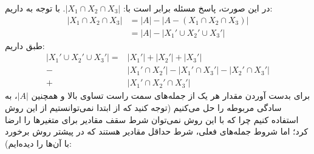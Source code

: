 \begin{PROBLEM}
{        در این صورت، پاسخ مسئله برابر است با:
        $|X_1 \cap X_2 \cap X_3| $.
        با توجه به 
         داریم:
        \begin{align*}
         |X_1 \cap X_2 \cap X_3| &= |A| - |A - (X_1 \cap X_2 \cap X_3)|\\
        &= |A| - |X_1' \cup X_2' \cup X_3'| 
        \end{align*}
        \p
        طبق 
         داریم:
        \begin{align*}
          |X_1' \cup X_2' \cup X_3'| = &|X_1'| + |X_2'| + |X_3'|\\
          - &|X_1' \cap X_2'| - |X_1' \cap X_3'| - |X_2' \cap X_3'|\\
          + &|X_1' \cap X_2' \cap X_3'| 
        \end{align*}
        \p
        برای بدست آوردن مقدار هر یک از جمله‌های سمت راست تساوی بالا و همچنین
        $|A|$،
        به سادگی 
         مربوطه را حل می‌کنیم
        (توجه کنید که از ابتدا نمی‌توانستیم
        از این روش استفاده کنیم چرا که با این روش نمی‌توان شرط سقف مقادیر برای
        متغیر‌ها را ارضا کرد؛ اما شروط جمله‌های فعلی، شرط حداقل مقادیر هستند که
        در پیشتر روش برخورد با آن‌ها را دیده‌ایم):
        
}
\end{PROBLEM}
